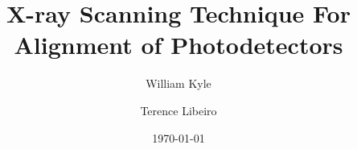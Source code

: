 \documentclass[preprint,5p]{elsarticle}
\begin{document}
\date{\today}%

\begin{frontmatter}
\title{X-ray Scanning Technique For Alignment of Photodetectors}
\author[uci]{William Kyle}
\author[uci]{Terence Libeiro}
\address[uci]{University of California, Irvine}

\begin{abstract}

\end{abstract}
\end{frontmatter}

















%
\end{document}
